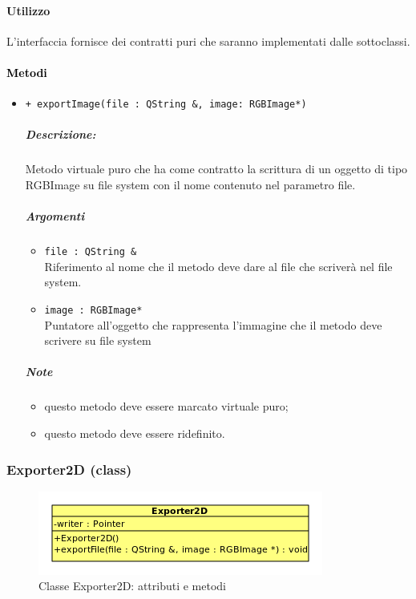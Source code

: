\paragraph{Utilizzo\\}
L'interfaccia fornisce dei contratti puri che saranno implementati dalle sottoclassi.
\paragraph{\textcolor{black}{Metodi\\}}
	\begin{itemize}


		\item \color{blue}\verb!+ exportImage(file : QString &, image: RGBImage*)!
		\subparagraph{Descrizione:} Metodo virtuale puro che ha come contratto la scrittura di un oggetto di tipo RGBImage su file system con il nome contenuto nel parametro file.
\color{black}
		\subparagraph{Argomenti}
			\begin{itemize}
				\item \color{RoyalPurple}\verb!file : QString &! \\ 
				\color{black}Riferimento al nome che il metodo deve dare al file che scriverà nel file system.
				\item \color{RoyalPurple}\verb!image : RGBImage*! \\ 
				\color{black}Puntatore all'oggetto che rappresenta l'immagine che il metodo deve scrivere su file system
			\end{itemize}
\color{black}
		\subparagraph{Note}
			\begin{itemize}
				\item questo metodo deve essere marcato virtuale puro;
				\item questo metodo deve essere ridefinito.
			\end{itemize}
	\end{itemize}
		\color{black}

\subsubsection{Exporter2D (class)}
\label{spexporter2d}
\begin{figure}[!h]
\centering
			\includegraphics[scale=1]{./Content/Immagini/model/Exporter2D.png}
			\caption{Classe Exporter2D: attributi e metodi}
			\label{cl_exporter2d}
\end{figure}
